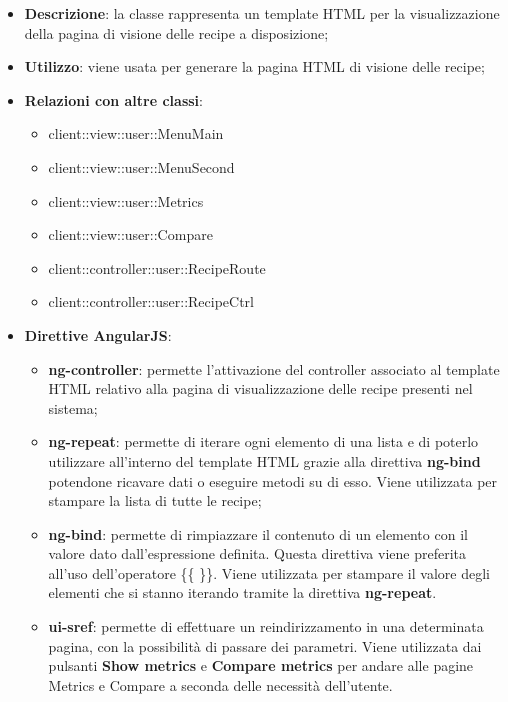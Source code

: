 			\begin{itemize}
				\item \textbf{Descrizione}: la classe rappresenta un template HTML per la visualizzazione della pagina di visione delle recipe a disposizione;
				\item \textbf{Utilizzo}: viene usata per generare la pagina HTML di visione delle recipe;
				\item \textbf{Relazioni con altre classi}:
					\begin{itemize}
						\item client::view::user::MenuMain
						\item client::view::user::MenuSecond
						\item client::view::user::Metrics
						\item client::view::user::Compare
						\item client::controller::user::RecipeRoute
						\item client::controller::user::RecipeCtrl
					\end{itemize}
				\item \textbf{Direttive AngularJS}:
					\begin{itemize}
						\item \textbf{ng-controller}: permette l'attivazione del controller associato al template HTML relativo alla pagina di visualizzazione delle recipe presenti nel sistema;
						\item \textbf{ng-repeat}: permette di iterare ogni elemento di una lista e di poterlo utilizzare all'interno del template HTML grazie alla direttiva \textbf{ng-bind} potendone ricavare dati o eseguire metodi su di esso. Viene utilizzata per stampare la lista di tutte le recipe;
						\item \textbf{ng-bind}: permette di rimpiazzare il contenuto di un elemento con il valore dato dall'espressione definita. Questa direttiva viene preferita all'uso dell'operatore \{\{ \}\}. Viene utilizzata per stampare il valore degli elementi che si stanno iterando tramite la direttiva \textbf{ng-repeat}.
						\item \textbf{ui-sref}: permette di effettuare un reindirizzamento in una determinata pagina, con la possibilità di passare dei parametri. Viene utilizzata dai pulsanti \textbf{Show metrics} e \textbf{Compare metrics} per andare alle pagine Metrics e Compare a seconda delle necessità dell'utente.
					\end{itemize}
			\end{itemize}


